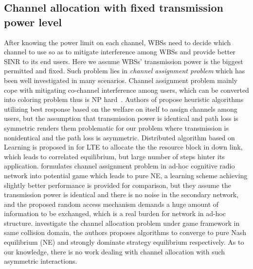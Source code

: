 \subsection{Channel allocation with fixed transmission power level}
\label{CA}
After knowing the power limit on each channel, WBSs need to decide which channel to use so as to mitigate interference among WBSs and provide better SINR to its end users. 
Here we assume WBSs' transmission power is the biggest permitted and fixed. Such problem lies in \textit{channel assignment problem} which has been well investigated in many scenarios. Channel assignment problem mainly cope with mitigating co-channel interference among users, which can be converted into coloring problem thus is NP hard~\cite{Hyacinth}. Authors of \cite{Babadi08, Ko_DistributedCA} propose heuristic algorithms utilizing best response based on the welfare on itself to assign channels among users, but the assumption that transmission power is identical and path loss is symmetric renders them problematic for our problem where transmission is nonidentical and the path loss is asymmetric.
Distributed algorithm based on Learning is proposed in \cite{cogCE_huang} for LTE to allocate the the resource block in down link, which leads to correlated equilibrium, but large number of steps hinter its application.
\cite{CApotentialLearning_05dyspan} formulates channel assignment problem in ad-hoc cognitive radio network into potential game which leads to pure NE, a learning scheme achieving slightly better performance is provided for comparison, but they assume the transmission power is identical and there is no noise in the secondary network, and the proposed random access mechanism demands a huge amount of information to be exchanged, which is a real burden for network in ad-hoc structure.
\cite{CA_Felegyhazi_07infocom, Wu_GOP_CA_08infocom} investigate the channel allocation problem under game framework in same collision domain, the authors proposes algorithms to converge to pure Nash equilibrium (NE) and strongly dominate strategy equilibrium respectively. 
As to our knowledge, there is no work dealing with channel allocation with such asymmetric interactions. 

